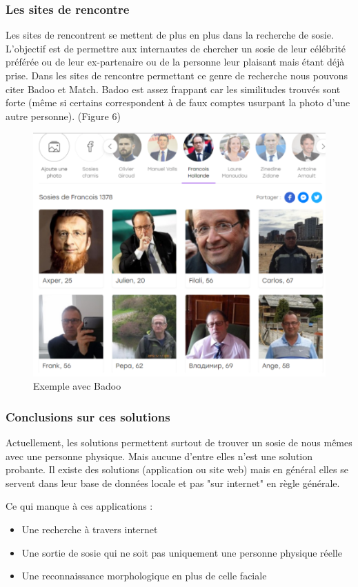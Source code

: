 \documentclass[a4paper,12pt]{article}
\begin{document}
\subsubsection{Les sites de rencontre}
Les sites de rencontrent se mettent de plus en plus dans la recherche de sosie. L'objectif est de permettre aux internautes de chercher un sosie de leur célébrité préférée ou de leur ex-partenaire ou de la personne leur plaisant mais étant déjà prise. Dans les sites de rencontre permettant ce genre de recherche nous pouvons citer Badoo et Match. 
Badoo est assez frappant car les similitudes trouvés sont forte (même si certains correspondent à de faux comptes usurpant la photo d'une autre personne). (Figure 6) 
\begin{figure}[!h]
    \centering
        \includegraphics[scale=1]{images/badoo.PNG}
        \caption{Exemple avec Badoo}
    \end{figure}
    
\subsubsection{Conclusions sur ces solutions}

Actuellement, les solutions permettent surtout de trouver un sosie de nous mêmes avec une personne physique. Mais aucune d'entre elles n'est une solution probante. Il existe des solutions (application ou site web) mais en général elles se servent dans leur base de données locale et pas "sur internet" en règle générale. 

Ce qui manque à ces applications : 
\begin{itemize}
    \item Une recherche à travers internet 
    \item Une sortie de sosie qui ne soit pas uniquement une personne physique réelle 
    \item Une reconnaissance morphologique en plus de celle faciale
\end{itemize}
\end{document}
